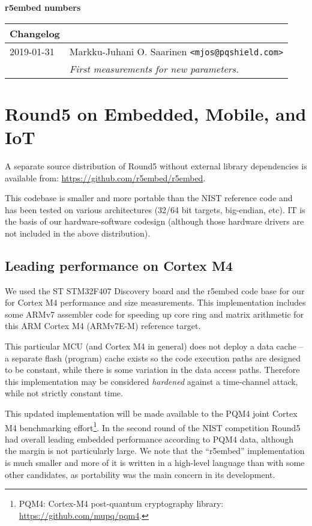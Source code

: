 \documentclass[a4paper]{article}
\begin{document}
\begin{center}
    {\large {\bf r5embed numbers \pdfdate}}

\vspace{3ex}
\begin{tabular}{l p{90mm}}
{\bf Changelog} \\
\hline
2019-01-31  & Markku-Juhani O. Saarinen \verb|<mjos@pqshield.com>| \\
            & {\it First measurements for new parameters.}  \\
\hline
\end{tabular}
\end{center}


\section{Round5 on Embedded, Mobile, and IoT}

A separate source distribution of Round5 without external library
dependencies is available from: \url{https://github.com/r5embed/r5embed}.

This codebase is smaller and more portable than the NIST reference code and has
been tested on various architectures (32/64 bit targets, big-endian, etc). IT is
the basis of our hardware-software codesign (although those hardware drivers
are not included in the above distribution).


\subsection{Leading performance on Cortex M4}

We used the ST STM32F407 Discovery board and the r5embed code base for our
for Cortex M4 performance and size measurements. This implementation
includes some ARMv7 assembler code for speeding up core ring and matrix
arithmetic for this ARM Cortex M4 (ARMv7E-M) reference target.

This particular MCU (and Cortex M4 in general) does not deploy a data cache --
a separate flash (program) cache exists so the code execution paths are
designed to be constant, while there is some variation in the data
access paths. Therefore this implementation may be considered \emph{hardened}
against a time-channel attack, while not strictly constant time.

This updated implementation will be made available to the PQM4 joint Cortex M4
benchmarking effort\footnote{PQM4: Cortex-M4 post-quantum cryptography library:
\url{https://github.com/mupq/pqm4}.}. In the second round of the NIST
competition Round5 had overall leading embedded performance according to PQM4
data, although the margin is not particularly large. We note that the
``r5embed'' implementation is much smaller and more of it is written in a
high-level language than with some other candidates, as portability was the
main concern in its development.
\end{document}
